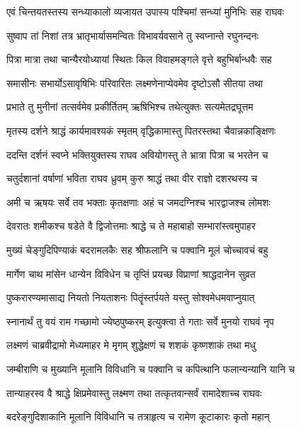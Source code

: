 \twolineshloka
{एवं चिन्तयतस्तस्य सन्ध्याकालो व्यजायत}
{उपास्य पश्चिमां सन्ध्यां मुनिभिः सह राघवः} %

\twolineshloka
{सुष्वाप तां निशां तत्र भ्रातृभार्यासमन्वितः}
{विभावर्यवसाने तु स्वप्नान्ते रघुनन्दनः} %

\twolineshloka
{पित्रा मात्रा तथा चान्यैरयोध्यायां स्थितः किल}
{विवाहमङ्गले वृत्ते बहुभिर्बान्धवैः सह} %

\twolineshloka
{समासीनः सभार्योऽसावृषिभिः परिवारितः}
{लक्ष्मणेनाप्येवमेव दृष्टोऽसौ सीतया तथा} %

\twolineshloka
{प्रभाते तु मुनीनां तत्सर्वमेव प्रकीर्तितम्}
{ऋषिभिश्च तथेत्युक्तः सत्यमेतद्रघूत्तम} %

\twolineshloka
{मृतस्य दर्शने श्राद्धं कार्यमावश्यकं स्मृतम्}
{वृद्धिकामास्तु पितरस्तथा चैवान्नकाङ्क्षिणः} %

\twolineshloka
{ददन्ति दर्शनं स्वप्ने भक्तियुक्तस्य राघव}
{अवियोगस्तु ते भ्रात्रा पित्रा च भरतेन च} %

\twolineshloka
{चतुर्दशानां वर्षाणां भविता राघव ध्रुवम्}
{कुरु श्राद्धं तथा वीर राज्ञो दशरथस्य च} %

\twolineshloka
{अमी च ऋषयः सर्वे तव भक्ताः कृतक्षणाः}
{अहं च जमदग्निश्च भारद्वाजश्च लोमशः} %

\twolineshloka
{देवरातः शमीकश्च षडेते वै द्विजोत्तमाः}
{श्राद्धे च ते महाबाहो सम्भारांस्त्वमुपाहर} %

\twolineshloka
{मुख्यं चेङ्गुदिपिण्याकं बदरामलकैः सह}
{श्रीफलानि च पक्वानि मूलं चोच्चावचं बहु} %

\twolineshloka
{मार्गेण चाथ मांसेन धान्येन विविधेन च}
{तृप्तिं प्रयच्छ विप्राणां श्राद्धदानेन सुव्रत} %

\twolineshloka
{पुष्करारण्यमासाद्य नियतो नियताशनः}
{पितॄंस्तर्पयते यस्तु सोश्वमेधमवाप्नुयात्} %

\twolineshloka
{स्नानार्थं तु वयं राम गच्छामो ज्येष्ठपुष्करम्}
{इत्युक्त्वा ते गताः सर्वे मुनयो राघवं नृप} %

\twolineshloka
{लक्ष्मणं चाब्रवीद्रामो मेध्यमाहर मे मृगम्}
{शुद्धेक्षणं च शशकं कृष्णशाकं तथा मधु} %

\twolineshloka
{जम्बीराणि च मुख्यानि मूलानि विविधानि च}
{पक्वानि च कपित्थानि फलान्यन्यानि यानि च} %

\twolineshloka
{तान्याहरस्व वै श्राद्धे क्षिप्रमेवास्तु लक्ष्मण}
{तथा तत्कृतवान्सर्वं रामादेशाच्च राघवः} %

\twolineshloka
{बदरेङ्गुदिशाकानि मूलानि विविधानि च}
{तत्राहृत्य च रामेण कूटाकारः कृतो महान्} %


